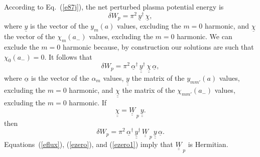 \documentclass[12pt,prb,aps]{revtex4-1}
\begin{document}
According to Eq.~(\ref{e87j}), the net perturbed plasma potential energy is
\begin{equation}
\delta W_p = \pi^2\,\underline{y}^{\dag}\,\underline{\chi},
\end{equation}
where $\underline{y}$ is the vector of the $y_m(a)$ values, excluding the $m=0$ harmonic,  and $\underline{\chi}$  the vector of the $\chi_m(a_-)$ values,
excluding the $m=0$ harmonic.  We can exclude the $m=0$ harmonic because, by construction our solutions are such that $\chi_0(a_-)=0$. It follows that
\begin{equation}
\delta W_p = \pi^2\,\underline{\alpha}^\dag \,\underline{\underline{y}}^\dag \,\underline{\underline{\chi}}\,\underline{\alpha},
\end{equation}
where $\underline{\alpha}$ is the vector of the $\alpha_m$ values, $\underline{\underline{y}}$ the matrix of the $y_{mm'}(a)$ values, excluding the $m=0$ harmonic, 
and $\underline{\underline{\chi}}$ the matrix of the $\chi_{mm'}(a_-)$ values, excluding the $m=0$ harmonic. 
If
\begin{equation}
\underline{\underline{\chi}} = \underline{\underline{W}}_{\,p}\,\underline{\underline{y}}.
\end{equation}
then 
\begin{equation}
\delta W_p = \pi^2\,\underline{\alpha}^\dag \,\underline{\underline{y}}^\dag \,\underline{\underline{W}}_{\,p}\,\underline{\underline{y}}\,\underline{\alpha}.
\end{equation}
Equations~(\ref{eflux}), (\ref{ezero}), and (\ref{ezero1}) imply that $\underline{\underline{W}}_{\,p}$ is Hermitian. 
\end{document}

